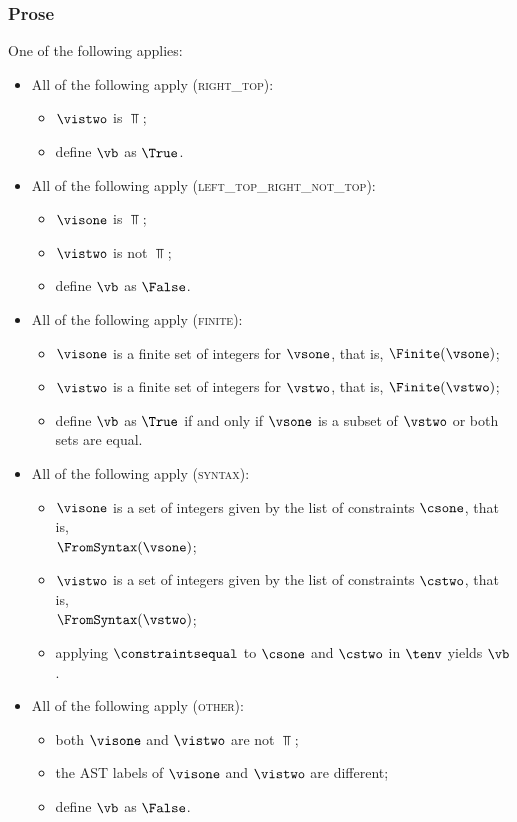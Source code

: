 \subsubsection{Prose}
One of the following applies:
\begin{itemize}
  \item All of the following apply (\textsc{right\_top}):
  \begin{itemize}
    \item $\vistwo$ is $\Top$;
    \item define $\vb$ as $\True$.
  \end{itemize}

  \item All of the following apply (\textsc{left\_top\_right\_not\_top}):
  \begin{itemize}
    \item $\visone$ is $\Top$;
    \item $\vistwo$ is not $\Top$;
    \item define $\vb$ as $\False$.
  \end{itemize}

  \item All of the following apply (\textsc{finite}):
  \begin{itemize}
    \item $\visone$ is a finite set of integers for $\vsone$, that is, $\Finite(\vsone)$;
    \item $\vistwo$ is a finite set of integers for $\vstwo$, that is, $\Finite(\vstwo)$;
    \item define $\vb$ as $\True$ if and only if $\vsone$ is a subset of $\vstwo$ or both sets are equal.
  \end{itemize}

  \item All of the following apply (\textsc{syntax}):
  \begin{itemize}
    \item $\visone$ is a set of integers given by the list of constraints $\csone$, that is, \\ $\FromSyntax(\vsone)$;
    \item $\vistwo$ is a set of integers given by the list of constraints $\cstwo$, that is, \\ $\FromSyntax(\vstwo)$;
    \item applying $\constraintsequal$ to $\csone$ and $\cstwo$ in $\tenv$ yields $\vb$.
  \end{itemize}

  \item All of the following apply (\textsc{other}):
  \begin{itemize}
    \item both $\visone$ and $\vistwo$ are not $\Top$;
    \item the AST labels of $\visone$ and $\vistwo$ are different;
    \item define $\vb$ as $\False$.
  \end{itemize}
\end{itemize}


